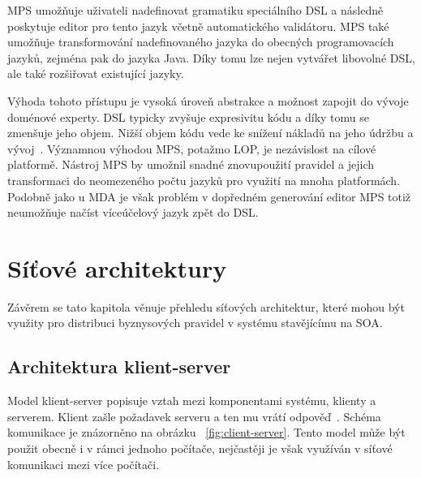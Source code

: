 MPS umožňuje uživateli nadefinovat gramatiku speciálního \gls{DSL} a následně poskytuje
editor pro tento jazyk včetně automatického validátoru. MPS také umožňuje transformování
nadefinovaného jazyka do obecných programovacích jazyků, zejména pak do jazyka Java.
Díky tomu lze nejen vytvářet libovolné \gls{DSL}, ale také rozšiřovat existující jazyky.


Výhoda tohoto přístupu je vysoká úroveň abstrakce a možnost zapojit do vývoje doménové experty.
\gls{DSL} typicky zvyšuje expresivitu kódu a díky tomu se zmenšuje jeho objem.
Nižší objem kódu vede ke snížení nákladů na jeho údržbu a vývoj~\cite{littman1987mental}\cite{soloway1986empirical}.
Významnou výhodou MPS, potažmo \gls{LOP}, je nezávislost na cílové platformě.
Nástroj MPS by umožnil snadné znovupoužití pravidel a jejich transformaci do neomezeného počtu jazyků pro
využití na mnoha platformách. Podobně jako u \gls{MDA} je však problém v dopředném
generování \textendash\xspace editor MPS totiž neumožňuje načíst víceúčelový jazyk zpět do \gls{DSL}.

\section{Síťové architektury}

Závěrem se tato kapitola věnuje přehledu síťových architektur, které mohou být využity pro
distribuci byznysových pravidel v systému stavějícímu na \gls{SOA}.

\subsection{Architektura klient-server}\label{sec:client-server}

Model klient-server popisuje vztah mezi komponentami systému, klienty a serverem.
Klient zašle požadavek serveru a ten mu vrátí odpověď~\cite{berson1992client}.
Schéma komunikace je znázorněno na obrázku ~\ref{fig:client-server}.
Tento model může být použit obecně i v rámci jednoho počítače,
nejčastěji je však využíván v síťové komunikaci mezi více počítači.

